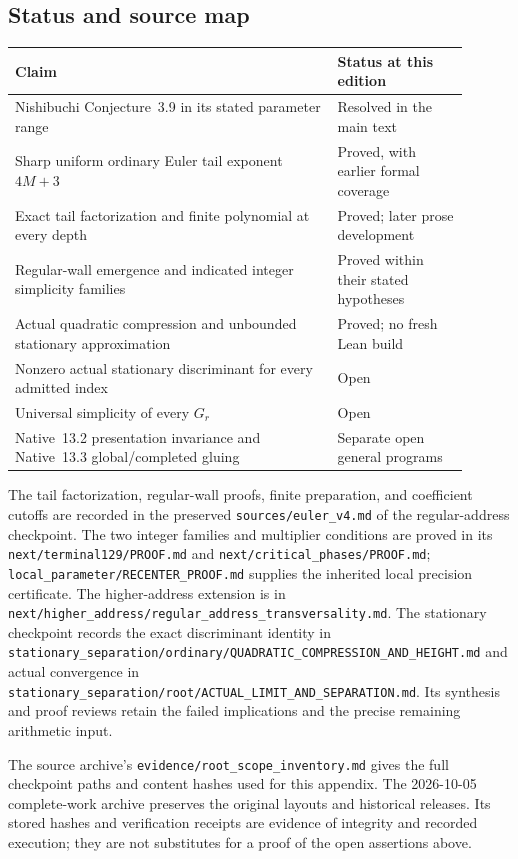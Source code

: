 \subsection{Status and source map}
\label{app:root:evidence}

\begin{center}
\begin{tabular}{>{\raggedright\arraybackslash}p{0.64\linewidth}>{\raggedright\arraybackslash}p{0.26\linewidth}}
\toprule
Claim & Status at this edition\\
\midrule
Nishibuchi Conjecture~3.9 in its stated parameter range
 & Resolved in the main text\\
Sharp uniform ordinary Euler tail exponent $4M+3$
 & Proved, with earlier formal coverage\\
Exact tail factorization and finite polynomial at every depth
 & Proved; later prose development\\
Regular-wall emergence and indicated integer simplicity families
 & Proved within their stated hypotheses\\
Actual quadratic compression and unbounded stationary approximation
 & Proved; no fresh Lean build\\
Nonzero actual stationary discriminant for every admitted index
 & Open\\
Universal simplicity of every $G_r$
 & Open\\
Native~13.2 presentation invariance and Native~13.3 global/completed gluing
 & Separate open general programs\\
\bottomrule
\end{tabular}
\end{center}

The tail factorization, regular-wall proofs, finite preparation, and
coefficient cutoffs are recorded in the preserved
\nolinkurl{sources/euler_v4.md} of the regular-address checkpoint.
The two integer families and multiplier conditions are proved in its
\nolinkurl{next/terminal129/PROOF.md} and
\nolinkurl{next/critical_phases/PROOF.md};
\nolinkurl{local_parameter/RECENTER_PROOF.md} supplies the inherited
local precision certificate. The higher-address extension is in
\nolinkurl{next/higher_address/regular_address_transversality.md}.
The stationary checkpoint records the exact discriminant identity in
\nolinkurl{stationary_separation/ordinary/QUADRATIC_COMPRESSION_AND_HEIGHT.md}
and actual convergence in
\nolinkurl{stationary_separation/root/ACTUAL_LIMIT_AND_SEPARATION.md}.
Its synthesis and proof reviews retain the failed
implications and the precise remaining arithmetic input.

The source archive's \nolinkurl{evidence/root_scope_inventory.md} gives
the full checkpoint paths and content hashes used for this appendix.
The 2026-10-05 complete-work archive preserves the original layouts and
historical releases. Its stored hashes and verification receipts are
evidence of integrity and recorded execution; they are not substitutes
for a proof of the open assertions above.
